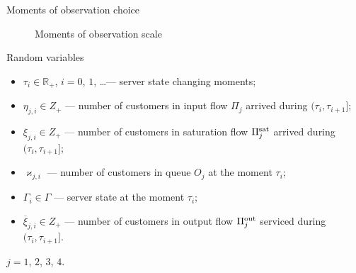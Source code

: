\documentclass[10pt]{beamer}
\begin{document}
\begin{frame} {Moments of observation choice}
  \begin{figure}[h]
    \centering
    \caption{Moments of observation scale}
    \label{VK:fig:3}
  \end{figure}
\end{frame}








\begin{frame}{Random variables}
  \begin{itemize}
    \item $\tau_i \in {\mathbb R}_+$, $i=0$, $1$, \ldots --- server state changing moments;
    \item $\eta_{j,i} \in Z_+$ --- number of customers in input flow $\Pi_j$ arrived during $(\tau_i, \tau_{i+1}]$;
    \item $\xi_{j,i} \in Z_+$ --- number of customers in saturation flow $\Pi^{\mbox{\scriptsize{sat}}}_j$ arrived during $(\tau_i, \tau_{i+1}]$;
    \item $\varkappa_{j,i}$ --- number of customers in queue $O_j$ at the moment $\tau_i$;
  \item $\Gamma_i\in\Gamma$ --- server state at the moment  $\tau_i$;
  \item $\overline{\xi}_{j,i} \in Z_+$ --- number of customers in output flow $\Pi^{\mbox{\scriptsize{out}}}_j$ serviced during $(\tau_i, \tau_{i+1}]$.
  \end{itemize}
  $j=1$,  $2$, $3$, $4$.
\end{frame}
\end{document}
